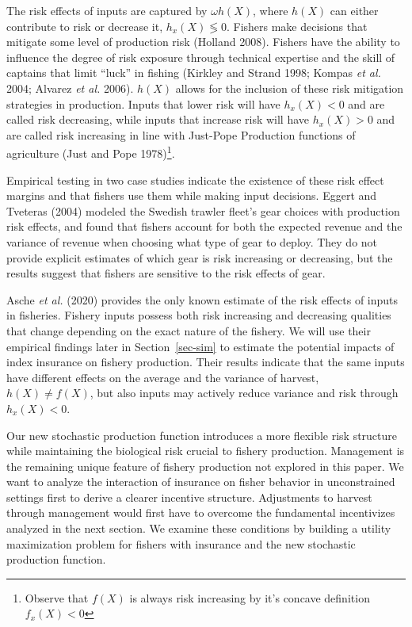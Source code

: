 \documentclass[
  letterpaper,
  DIV=11,
  numbers=noendperiod]{scrartcl}
\theoremstyle{plain}
\theoremstyle{plain}
\theoremstyle{remark}
\begin{document}
The risk effects of inputs are captured by \(\omega h(X)\), where
\(h(X)\) can either contribute to risk or decrease it,
\(h_x(X)\lessgtr0\). Fishers make decisions that mitigate some level of
production risk (Holland 2008). Fishers have the ability to influence
the degree of risk exposure through technical expertise and the skill of
captains that limit ``luck'' in fishing (Kirkley and Strand 1998; Kompas
\emph{et al.} 2004; Alvarez \emph{et al.} 2006). \(h(X)\) allows for the
inclusion of these risk mitigation strategies in production. Inputs that
lower risk will have \(h_x(X)<0\) and are called risk decreasing, while
inputs that increase risk will have \(h_x(X)>0\) and are called risk
increasing in line with Just-Pope Production functions of agriculture
(Just and Pope 1978)\footnote{Observe that \(f(X)\) is always risk
  increasing by it's concave definition \(f_x(X)<0\)}.

Empirical testing in two case studies indicate the existence of these
risk effect margins and that fishers use them while making input
decisions. Eggert and Tveteras (2004) modeled the Swedish trawler
fleet's gear choices with production risk effects, and found that
fishers account for both the expected revenue and the variance of
revenue when choosing what type of gear to deploy. They do not provide
explicit estimates of which gear is risk increasing or decreasing, but
the results suggest that fishers are sensitive to the risk effects of
gear.

Asche \emph{et al.} (2020) provides the only known estimate of the risk
effects of inputs in fisheries. Fishery inputs possess both risk
increasing and decreasing qualities that change depending on the exact
nature of the fishery. We will use their empirical findings later in
Section~\ref{sec-sim} to estimate the potential impacts of index
insurance on fishery production. Their results indicate that the same
inputs have different effects on the average and the variance of
harvest, \(h(X)\neq f(X)\), but also inputs may actively reduce variance
and risk through \(h_x(X)<0\).

Our new stochastic production function introduces a more flexible risk
structure while maintaining the biological risk crucial to fishery
production. Management is the remaining unique feature of fishery
production not explored in this paper. We want to analyze the
interaction of insurance on fisher behavior in unconstrained settings
first to derive a clearer incentive structure. Adjustments to harvest
through management would first have to overcome the fundamental
incentivizes analyzed in the next section. We examine these conditions
by building a utility maximization problem for fishers with insurance
and the new stochastic production function.
\end{document}
